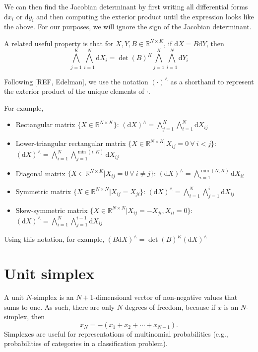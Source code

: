 \documentclass[11pt]{article}
\newcommand{\dv}[1]{\mathrm{d}{#1}}
\begin{document}
We can then find the Jacobian determinant by first writing all differential forms $\dv{x_i}$ or $\dv{y_i}$ and then computing the exterior product until the expression looks like the above.
For our purposes, we will ignore the sign of the Jacobian determinant.

A related useful property is that for $X,Y,B \in \mathbb{R}^{N \times K}$, if $\dv{X} = B \dv{Y}$, then
\[\bigwedge_{j=1}^K \bigwedge_{i=1}^N \dv{X_i} = \det(B)^K \bigwedge_{j=1}^K \bigwedge_{i=1}^N \dv{Y_i}\]

Following [REF, Edelman], we use the notation $(\cdot)^\wedge$ as a shorthand to represent the exterior product of the unique elements of $\cdot$.

For example,
\begin{itemize}
  \item Rectangular matrix $\{X \in \mathbb{R}^{N \times K}\}$: $(\dv{X})^\wedge = \bigwedge_{j=1}^K \bigwedge_{i=1}^N \dv{X_{ij}}$
  \item Lower-triangular rectangular matrix $\{X \in \mathbb{R}^{N \times K} | X_{ij} = 0\ \forall\ i < j\}$: $(\dv{X})^\wedge = \bigwedge_{i=1}^N \bigwedge_{j=1}^{\min(i, K)} \dv{X_{ij}}$
  \item Diagonal matrix $\{X \in \mathbb{R}^{N \times K} | X_{ij} = 0\ \forall\ i \ne j\}$: $(\dv{X})^\wedge = \bigwedge_{i=1}^{\min(N, K)} \dv{X_{ii}}$
  \item Symmetric matrix $\{X \in \mathbb{R}^{N \times N} | X_{ij} = X_{ji}\}$: $(\dv{X})^\wedge = \bigwedge_{i=1}^N \bigwedge_{j=1}^i \dv{X_{ij}}$
  \item Skew-symmetric matrix $\{X \in \mathbb{R}^{N \times N} | X_{ij} = -X_{ji}, X_{ii} = 0\}$: $(\dv{X})^\wedge = \bigwedge_{i=1}^N \bigwedge_{j=1}^{i-1} \dv{X_{ij}}$
\end{itemize}

Using this notation, for example, $(B \dv{X})^\wedge = \det(B)^K (\dv{X})^\wedge$

\section{Unit simplex}

A unit $N$-simplex is an $N + 1$-dimensional vector of non-negative
values that sums to one.  As such, there are only $N$ degrees of
freedom, because if $x$ is an $N$-simplex, then
\[
  x_N = -(x_1 + x_2 + \cdots + x_{N-1}).
\]
Simplexes are useful for representations of multinomial probabilities
(e.g., probabilities of categories in a classification problem).
\end{document}

